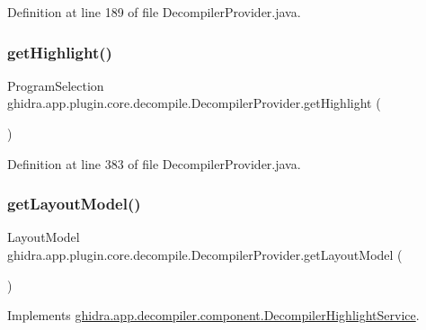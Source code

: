 Definition at line 189 of file Decompiler\+Provider.\+java.

\mbox{\label{classghidra_1_1app_1_1plugin_1_1core_1_1decompile_1_1_decompiler_provider_a34933fd2f3f357b09b4449a06f012bb5}} 
\subsubsection{\texorpdfstring{getHighlight()}{getHighlight()}}
{\footnotesize\ttfamily Program\+Selection ghidra.\+app.\+plugin.\+core.\+decompile.\+Decompiler\+Provider.\+get\+Highlight (\begin{DoxyParamCaption}{ }\end{DoxyParamCaption})\hspace{0.3cm}{\ttfamily [inline]}}



Definition at line 383 of file Decompiler\+Provider.\+java.

\mbox{\label{classghidra_1_1app_1_1plugin_1_1core_1_1decompile_1_1_decompiler_provider_a128dd05b94cfa8445f1fe80bc1410ee8}} 
\subsubsection{\texorpdfstring{getLayoutModel()}{getLayoutModel()}}
{\footnotesize\ttfamily Layout\+Model ghidra.\+app.\+plugin.\+core.\+decompile.\+Decompiler\+Provider.\+get\+Layout\+Model (\begin{DoxyParamCaption}{ }\end{DoxyParamCaption})\hspace{0.3cm}{\ttfamily [inline]}}



Implements \mbox{\hyperlink{interfaceghidra_1_1app_1_1decompiler_1_1component_1_1_decompiler_highlight_service_a684fe31c749767f23cc40d55d3159e0f}{ghidra.\+app.\+decompiler.\+component.\+Decompiler\+Highlight\+Service}}.



